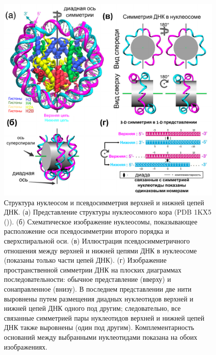 \begin{figure}[H]
\centering
\includegraphics[width=\textwidth]{images/p5/part5_2_nar/p5_2_f1.pdf}
\caption[Структура нуклеосом и псевдосимметрия верхней и нижней цепей ДНК.]{
Структура нуклеосом и псевдосимметрия верхней и нижней цепей ДНК. (а) Представление структуры нуклеосомного кора (PDB 1KX5 (\cite{davey_solvent_2002})). (б) Схематическое изображение нуклеосомы, показывающее расположение оси псевдосимметрии второго порядка и сверхспиральной оси. (в) Иллюстрация псевдосимметричного отношения между верхней и нижней цепями ДНК в нуклеосоме (показаны только части цепей ДНК). (г) Изображение пространственной симметрии ДНК на плоских диаграммах последовательности: обычное представление (вверху) и сонаправленное (внизу). В последнем представлении две нити выровнены путем размещения диадных нуклеотидов верхней и нижней цепей ДНК одного под другим; следовательно, все связанные симметрией пары нуклеотидов верхней и нижней цепей ДНК также выровнены (один под другим). Комплементарность оснований между выбранными нуклеотидами показана на обоих изображениях.}
\label{fig:p5:p5_2_f1}
\end{figure}

